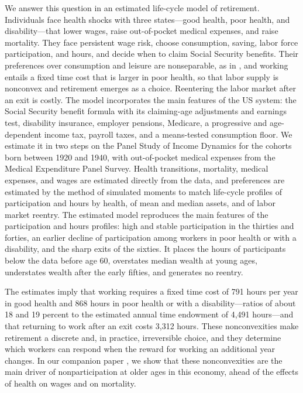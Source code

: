 We answer this question in an estimated life-cycle model of retirement. Individuals face health shocks with three states---good health, poor health, and disability---that lower wages, raise out-of-pocket medical expenses, and raise mortality. They face persistent wage risk, choose consumption, saving, labor force participation, and hours, and decide when to claim Social Security benefits. Their preferences over consumption and leisure are nonseparable, as in \citet{french2011effects}, and working entails a fixed time cost that is larger in poor health, so that labor supply is nonconvex and retirement emerges as a choice. Reentering the labor market after an exit is costly. The model incorporates the main features of the US system: the Social Security benefit formula with its claiming-age adjustments and earnings test, disability insurance, employer pensions, Medicare, a progressive and age-dependent income tax, payroll taxes, and a means-tested consumption floor. We estimate it in two steps on the Panel Study of Income Dynamics for the cohorts born between 1920 and 1940, with out-of-pocket medical expenses from the Medical Expenditure Panel Survey. Health transitions, mortality, medical expenses, and wages are estimated directly from the data, and preferences are estimated by the method of simulated moments to match life-cycle profiles of participation and hours by health, of mean and median assets, and of labor market reentry. The estimated model reproduces the main features of the participation and hours profiles: high and stable participation in the thirties and forties, an earlier decline of participation among workers in poor health or with a disability, and the sharp exits of the sixties. It places the hours of participants below the data before age 60, overstates median wealth at young ages, understates wealth after the early fifties, and generates no reentry.

The estimates imply that working requires a fixed time cost of 791 hours per year in good health and 868 hours in poor health or with a disability---ratios of about 18 and 19 percent to the estimated annual time endowment of 4,491 hours---and that returning to work after an exit costs 3,312 hours. These nonconvexities make retirement a discrete and, in practice, irreversible choice, and they determine which workers can respond when the reward for working an additional year changes. In our companion paper \citep{NdiayeYu2026frot}, we show that these nonconvexities are the main driver of nonparticipation at older ages in this economy, ahead of the effects of health on wages and on mortality.

